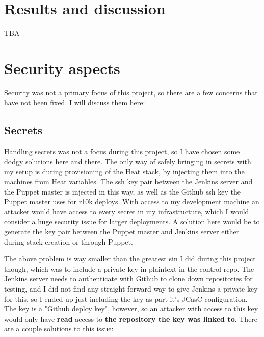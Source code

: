 
\section{Results and discussion}

TBA


\section{Security aspects}

Security was not a primary focus of this project, so there are a few concerns that have not been fixed. I will discuss them here:

\subsection{Secrets}

Handling secrets was not a focus during this project, so I have chosen some dodgy solutions here and there. The only way of safely bringing in secrets with my setup is during provisioning of the Heat stack, by injecting them into the machines from Heat variables. The ssh key pair between the Jenkins server and the Puppet master is injected in this way, as well as the Github ssh key the Puppet master uses for r10k deploys. With access to my development machine an attacker would have access to every secret in my infrastructure, which I would consider a huge security issue for larger deployments. A solution here would be to generate the key pair between the Puppet master and Jenkins server either during stack creation or through Puppet.

The above problem is way smaller than the greatest sin I did during this project though, which was to include a private key in plaintext in the control-repo. The Jenkins server needs to authenticate with Github to clone down repositories for testing, and I did not find any straight-forward way to give Jenkins a private key for this, so I ended up just including the key as part it's JCasC configuration. The key is a "Github deploy key", however, so an attacker with access to this key would only have \textbf{read} access to \textbf{the repository the key was linked to}. There are a couple solutions to this issue:

